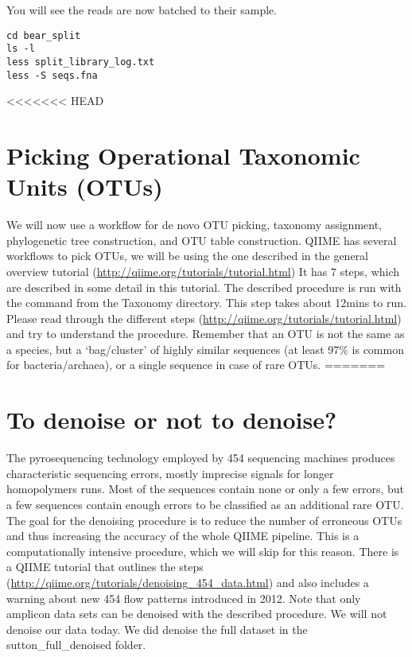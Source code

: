 \begin{steps}

You will see the reads are now batched to their sample.

\begin{lstlisting}
cd bear_split
ls -l
less split_library_log.txt
less -S seqs.fna
\end{lstlisting}

\end{steps}

<<<<<<< HEAD
\section{Picking Operational Taxonomic Units (OTUs)}

We will now use a workflow for de novo OTU picking, taxonomy assignment, phylogenetic tree construction, and OTU table construction. QIIME has several workflows to pick OTUs, we will be using the one described in the general overview tutorial (\url{http://qiime.org/tutorials/tutorial.html}) It has 7 steps, which are described in some detail in this tutorial. 
The described procedure is run with the command from the Taxonomy directory. This step takes about 12mins to run. Please read through the different steps (\url{http://qiime.org/tutorials/tutorial.html}) and try to understand the procedure. Remember that an OTU is not the same as a species, but a ‘bag/cluster’ of highly similar sequences (at least 97\% is common for bacteria/archaea), or a single sequence in case of rare OTUs.
=======
\section{To denoise or not to denoise?}

The pyrosequencing technology employed by 454 sequencing machines produces characteristic sequencing errors, mostly imprecise signals for longer homopolymers runs. Most of the sequences contain none or only a few errors, but a few sequences contain enough errors to be classified as an additional rare OTU. The goal for the denoising procedure is to reduce the number of erroneous OTUs and thus increasing the accuracy of the whole QIIME pipeline. This is a computationally intensive procedure, which we will skip for this reason. There is a QIIME tutorial that outlines the steps (\url{http://qiime.org/tutorials/denoising_454_data.html}) and also includes a warning about new 454 flow patterns introduced in 2012. Note that only amplicon data sets can be denoised with the described procedure. We will not denoise our data today. We did denoise the full dataset in the sutton\_full\_denoised folder.


